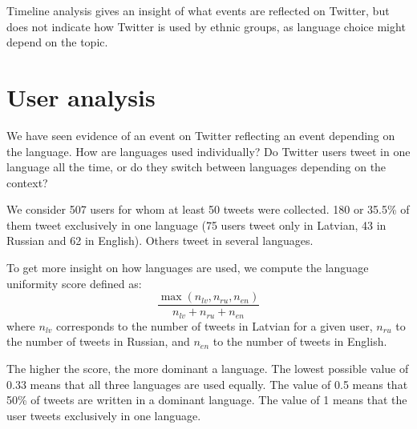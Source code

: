 \documentclass[11pt,a4paper]{article}
\begin{document}




Timeline analysis gives an insight of what events are reflected on Twitter, but does not indicate how Twitter is used by ethnic groups, as language choice might depend on the topic.

\section{User analysis}
\label{sec:lang-use}

We have seen evidence of an event on Twitter reflecting an event depending on the language. How are languages used individually? Do Twitter users tweet in one language all the time, or do they switch between languages depending on the context?

We consider 507 users for whom at least 50 tweets were collected. 180 or 35.5\% of them tweet exclusively in one language (75 users tweet only in Latvian, 43 in Russian and 62 in English). Others tweet in several languages.

To get more insight on how languages are used, we compute the language uniformity score defined as:
\begin{equation}
  \label{eq:score}
  \frac{\max(n_\mathit{lv}, n_\mathit{ru}, n_\mathit{en})}{n_\mathit{lv} + n_\mathit{ru} + n_\mathit{en}}
\end{equation}
where $n_\mathit{lv}$ corresponds to the number of tweets in Latvian for a given user, $n_\mathit{ru}$ to the number of tweets in Russian, and $n_\mathit{en}$ to the number of tweets in English.

The higher the score, the more dominant a language. The lowest possible value of 0.33 means that all three languages are used equally. The value of 0.5 means that 50\% of tweets are written in a dominant language. The value of 1 means that the user tweets exclusively in one language.
\end{document}

